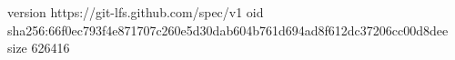 version https://git-lfs.github.com/spec/v1
oid sha256:66f0ec793f4e871707c260e5d30dab604b761d694ad8f612dc37206cc00d8dee
size 626416
